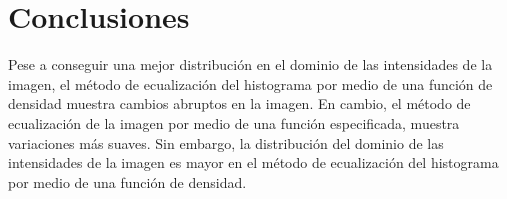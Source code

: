 \documentclass{article}
\begin{document}
\section{Conclusiones}\label{sec:con}
Pese a conseguir una mejor distribución en el dominio de las intensidades de la imagen, el método de ecualización del histograma por medio de una función de densidad muestra cambios abruptos en la imagen. En cambio, el método de ecualización de la imagen por medio de una función especificada, muestra variaciones más suaves. Sin embargo, la distribución del dominio de las intensidades de la imagen es mayor en el método de ecualización del histograma por medio de una función de densidad. 



\end{document}
